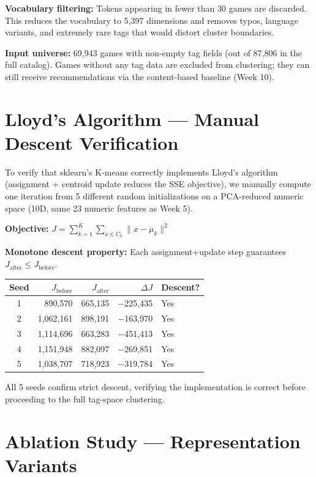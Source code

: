 \documentclass[11pt,a4paper]{article}
\begin{document}
\textbf{Vocabulary filtering:} Tokens appearing in fewer than 30 games are discarded. This reduces the vocabulary to 5,397 dimensions and removes typos, language variants, and extremely rare tags that would distort cluster boundaries.

\textbf{Input universe:} 69,943 games with non-empty tag fields (out of 87,806 in the full catalog). Games without any tag data are excluded from clustering; they can still receive recommendations via the content-based baseline (Week 10).

\section{Lloyd's Algorithm --- Manual Descent Verification}

To verify that sklearn's K-means correctly implements Lloyd's algorithm (assignment + centroid update reduces the SSE objective), we manually compute one iteration from 5 different random initializations on a PCA-reduced numeric space (10D, same 23 numeric features as Week 5).

\textbf{Objective:} $J = \sum_{k=1}^{K} \sum_{x \in C_k} \| x - \mu_k \|^2$

\textbf{Monotone descent property:} Each assignment+update step guarantees $J_{\text{after}} \leq J_{\text{before}}$.

\begin{longtable}{crrrl}
\toprule
\textbf{Seed} & \textbf{$J_\text{before}$} & \textbf{$J_\text{after}$} & \textbf{$\Delta J$} & \textbf{Descent?} \\
\midrule
1 & 890,570 & 665,135 & $-$225,435 & Yes \\
2 & 1,062,161 & 898,191 & $-$163,970 & Yes \\
3 & 1,114,696 & 663,283 & $-$451,413 & Yes \\
4 & 1,151,948 & 882,097 & $-$269,851 & Yes \\
5 & 1,038,707 & 718,923 & $-$319,784 & Yes \\
\bottomrule
\end{longtable}

All 5 seeds confirm strict descent, verifying the implementation is correct before proceeding to the full tag-space clustering.

\section{Ablation Study --- Representation Variants}
\end{document}
